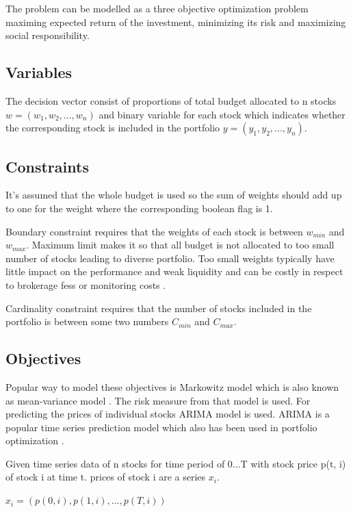 \documentclass[11pt]{article} %
\begin{document}
The problem can be modelled as a three objective optimization problem maximing expected return of the investment, minimizing its risk and maximizing social responsibility.

\subsection{Variables}

The decision vector consist of proportions of total budget allocated to n stocks $w = (w_1, w_2, ..., w_n)$ and binary variable for each stock which indicates whether the corresponding stock is included in the portfolio $y=(y_1, y_2,..., y_n)$. 

\subsection{Constraints}

It's assumed that the whole budget is used so the sum of weights should add up to one for the weight where the corresponding boolean flag is 1.

Boundary constraint requires that the weights of each stock is between $w_{min}$ and $w_{max}$. Maximum limit makes it so that all budget is not allocated to too small number of stocks leading to diverse portfolio. Too small weights typically have little impact on the performance and weak liquidity and can be costly in respect to brokerage fess or monitoring costs \cite{ertenlice2018survey}.

Cardinality constraint requires that the number of stocks included in the portfolio is between some two numbers $C_{min}$ and $C_{max}$. 

\subsection{Objectives}

Popular way to model these objectives is Markowitz model which is also known as mean-variance model \cite{kolm201460}. The risk measure from that model is used. For predicting the prices of individual stocks ARIMA model is used. ARIMA is a popular time series prediction model which also has been used in portfolio optimization \cite{kumar2021multi}. 

Given time series data of n stocks for time period of 0...T with stock price p(t, i) of stock i at time t. prices of stock i are a series $x_i$.

$x_i = (p(0, i), p(1, i), ..., p(T, i))$\\
\end{document}
